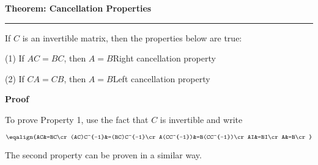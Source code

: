 \nopagenumbers
{\bf Theorem: Cancellation Properties}
\vskip 1mm
\hrule

\vskip 6pt
If $C$ is an invertible matrix, then the properties below are true:

\vskip 6pt
(1) If $AC=BC$, then $A=B$\quad\quad\quad Right cancellation property

\vskip 6pt
(2) If $CA=CB$, then $A=B$\quad\quad\quad Left cancellation property

\vskip 10pt
{\bf Proof}

\vskip 6pt
To prove Property 1, use the fact that $C$ is invertible and write

$$\eqalign{AC&=BC\cr
	(AC)C^{-1}&=(BC)C^{-1}\cr
	A(CC^{-1})&=B(CC^{-1})\cr
	AI&=BI\cr
	A&=B\cr}$$

The second property can be proven in a similar way.
\vfill\eject
\bye
